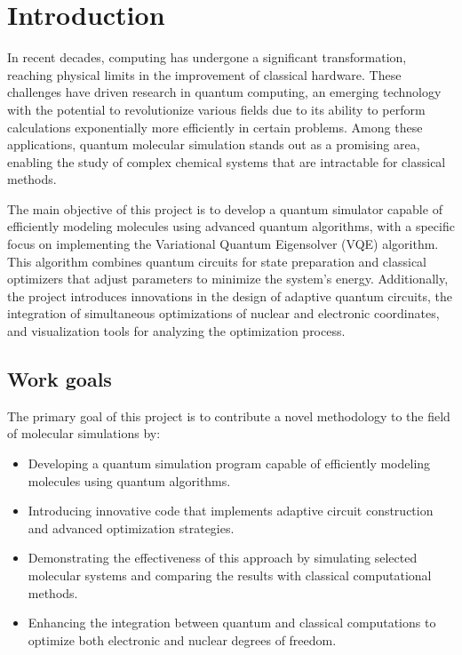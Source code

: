 
\chapter{Introduction}

In recent decades, computing has undergone a significant transformation, reaching physical limits in the improvement of classical hardware. These challenges have driven research in quantum computing, an emerging technology with the potential to revolutionize various fields due to its ability to perform calculations exponentially more efficiently in certain problems. Among these applications, quantum molecular simulation stands out as a promising area, enabling the study of complex chemical systems that are intractable for classical methods.

The main objective of this project is to develop a quantum simulator capable of efficiently modeling molecules using advanced quantum algorithms, with a specific focus on implementing the Variational Quantum Eigensolver (VQE) algorithm. This algorithm combines quantum circuits for state preparation and classical optimizers that adjust parameters to minimize the system's energy. Additionally, the project introduces innovations in the design of adaptive quantum circuits, the integration of simultaneous optimizations of nuclear and electronic coordinates, and visualization tools for analyzing the optimization process.

\section{Work goals}
The primary goal of this project is to contribute a novel methodology to the field of molecular simulations by:

\begin{itemize} 
  \item Developing a quantum simulation program capable of efficiently modeling molecules using quantum algorithms. 
  \item Introducing innovative code that implements adaptive circuit construction and advanced optimization strategies. 
  \item Demonstrating the effectiveness of this approach by simulating selected molecular systems and comparing the results with classical computational methods.
  \item Enhancing the integration between quantum and classical computations to optimize both electronic and nuclear degrees of freedom. 
\end{itemize}

